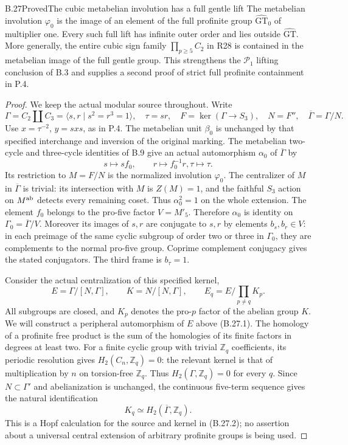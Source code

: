\begin{statement}{B.27}{Proved}{The cubic metabelian involution has a full gentle lift}
The metabelian involution $\varphi_0$ is the image of an
element of the full profinite group
$\widehat{\mathrm{GT}}_0$ of multiplier one. Every such
full lift has infinite outer order and lies outside
$\widehat{\mathrm{GT}}$.
More generally, the entire cubic sign family
$\prod_{p\geq5}C_2$ in R28 is contained in the metabelian
image of the full gentle group. This strengthens the
$\mathcal P_1$ lifting conclusion of B.3 and supplies a
second proof of strict full profinite containment in P.4.
\end{statement}
\begin{proof}
We keep the actual modular source throughout. Write
\[
 \Gamma=C_2\amalg C_3=\langle s,r\mid s^2=r^3=1\rangle,
 \quad\tau=sr,\quad F=\ker(\Gamma\to S_3),\quad
 N=F'',\quad\overline\Gamma=\Gamma/N.
\]
Use $x=\tau^{-2}$, $y=sxs$, as in P.4. The metabelian
unit $\beta_0$ is unchanged by that specified interchange
and inversion of the original marking.
The metabelian
two-cycle and three-cycle identities of B.9 give an actual
automorphism $\alpha_0$ of $\overline\Gamma$ by
\[
             s\mapsto sf_0,\qquad r\mapsto f_0^{-1}r,
                         \tau\mapsto\tau.
 \tag{B.27.1}
\]
Its restriction to $M=F/N$ is the normalized involution
$\varphi_0$. The centralizer of $M$ in $\overline\Gamma$
is trivial: its intersection with $M$ is $Z(M)=1$, and
the faithful $S_3$ action on $M^{\rm ab}$ detects every
remaining coset. Thus $\alpha_0^2=1$ on the whole extension.
The element $f_0$ belongs to the pro-five factor
$V=M'_5$. Therefore $\alpha_0$ is identity on
$\Gamma_0=\overline\Gamma/V$.
Moreover its images of $s,r$ are conjugate to $s,r$ by
elements $b_s,b_r\in V$: in each preimage of the same
cyclic subgroup of order two or three in $\Gamma_0$, they
are complements to the normal pro-five group. Coprime
complement conjugacy gives the stated conjugators.
The third frame is $b_\tau=1$.

Consider the actual centralization of this specified kernel,
\[
 E=\Gamma/[N,\Gamma],\qquad
 K=N/[N,\Gamma],\qquad E_q=E/\prod_{p\ne q}K_p.
 \tag{B.27.2}
\]
All subgroups are closed, and $K_p$ denotes the pro-$p$
factor of the abelian group $K$. We will construct a
peripheral automorphism of $E$ above (B.27.1).
The homology of a profinite free product is the sum of
the homologies of its finite factors in degrees at least
two. For a finite cyclic group with trivial
$\mathbb Z_q$ coefficients, its periodic resolution gives
$H_2(C_n,\mathbb Z_q)=0$: the relevant kernel is that
of multiplication by $n$ on torsion-free $\mathbb Z_q$.
Thus $H_2(\Gamma,\mathbb Z_q)=0$ for every $q$.
Since $N\subset\Gamma'$ and abelianization is unchanged,
the continuous five-term sequence gives the natural
identification
\[
                  K_q\simeq H_2(\overline\Gamma,\mathbb Z_q).
 \tag{B.27.3}
\]
This is a Hopf calculation for the source and kernel in
(B.27.2); no assertion about a universal central extension
of arbitrary profinite groups is being used.


\end{proof}
